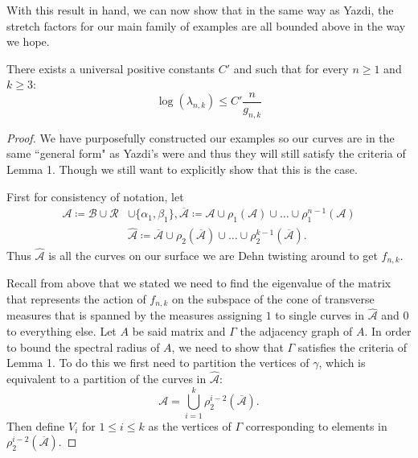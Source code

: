 With this result in hand, we can now show that in the same way as Yazdi, the stretch factors for our main family of examples are all bounded above in the way we hope.

\begin{lem}
There exists a universal positive constants $C'$ and such that for every $n \geq 1$ and $k \geq 3$:
$$\log(\lambda_{n,k}) \leq C'\frac{n}{g_{n,k}}$$
\end{lem}

\begin{proof}
We have purposefully constructed our examples so our curves are in the same ``general form" as Yazdi's were and thus they will still satisfy the criteria of Lemma 1. Though we still want to explicitly show that this is the case.

First for consistency of notation, let
\begin{align*}
    \mathcal{A} \coloneqq \mathcal{B} \cup \mathcal{R} &\cup \{\alpha_1,\beta_1\}, \overline{\mathcal{A}} \coloneqq \mathcal{A} \cup \rho_1(\mathcal{A}) \cup \dots \cup \rho_1^{n-1}(\mathcal{A}) \\
    &\hat{\mathcal{A}} \coloneqq \overline{\mathcal{A}} \cup \rho_2(\overline{\mathcal{A}}) \cup \dots \cup \rho_2^{k-1}(\overline{\mathcal{A}}).
\end{align*}
Thus $\hat{\mathcal{A}}$ is all the curves on our surface we are Dehn twisting around to get $f_{n,k}$.

Recall from above that we stated we need to find the eigenvalue of the matrix that represents the action of $f_{n,k}$ on the subspace of the cone of transverse measures that is spanned by the measures assigning $1$ to single curves in $\hat{\mathcal{A}}$ and 0 to everything else. Let $A$ be said matrix and $\Gamma$ the adjacency graph of $A$. In order to bound the spectral radius of $A$, we need to show that $\Gamma$ satisfies the criteria of Lemma 1. To do this we first need to partition the vertices of $\gamma$, which is equivalent to a partition of the curves in $\hat{\mathcal{A}}$: $$\mathcal{A} = \bigcup_{i=1}^k \rho_2^{i-2}(\overline{\mathcal{A}}).$$ Then define $V_i$ for $1 \leq i \leq k$ as the vertices of $\Gamma$ corresponding to elements in $\rho_2^{i-2}(\overline{\mathcal{A}})$.


\end{proof}
